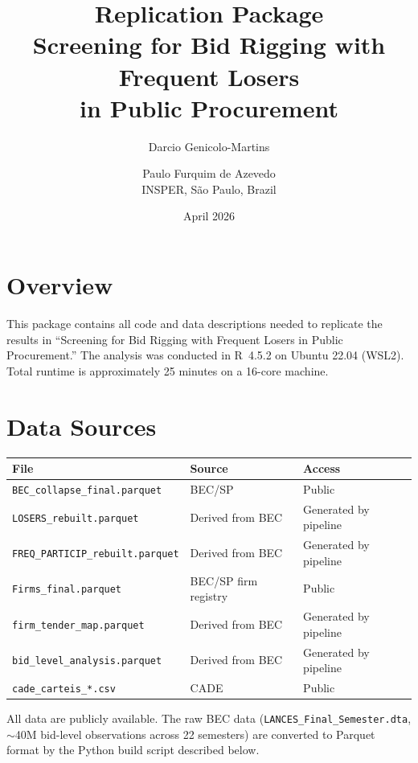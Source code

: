 \documentclass[11pt]{article}
\title{Replication Package\\[4pt]
\large Screening for Bid Rigging with Frequent Losers\\
in Public Procurement}
\author{Darcio Genicolo-Martins \and Paulo Furquim de Azevedo\\
\small INSPER, S\~ao Paulo, Brazil}
\date{April 2026}
\begin{document}
\maketitle

\section{Overview}

This package contains all code and data descriptions needed to
replicate the results in ``Screening for Bid Rigging with Frequent
Losers in Public Procurement.'' The analysis was conducted in R~4.5.2
on Ubuntu 22.04 (WSL2). Total runtime is approximately 25 minutes on
a 16-core machine.

\section{Data Sources}

\begin{table}[h]
\centering
\small
\begin{tabular}{lll}
\toprule
File & Source & Access \\
\midrule
\texttt{BEC\_collapse\_final.parquet} & BEC/SP & Public\footnotemark \\
\texttt{LOSERS\_rebuilt.parquet} & Derived from BEC & Generated by pipeline \\
\texttt{FREQ\_PARTICIP\_rebuilt.parquet} & Derived from BEC & Generated by pipeline \\
\texttt{Firms\_final.parquet} & BEC/SP firm registry & Public \\
\texttt{firm\_tender\_map.parquet} & Derived from BEC & Generated by pipeline \\
\texttt{bid\_level\_analysis.parquet} & Derived from BEC & Generated by pipeline \\
\texttt{cade\_carteis\_*.csv} & CADE & Public\footnotemark \\
\bottomrule
\end{tabular}
\end{table}

\noindent All data are publicly available. The raw BEC data
(\texttt{LANCES\_Final\_Semester.dta}, $\sim$40M bid-level
observations across 22 semesters) are converted to Parquet format by
the Python build script described below.
\end{document}
